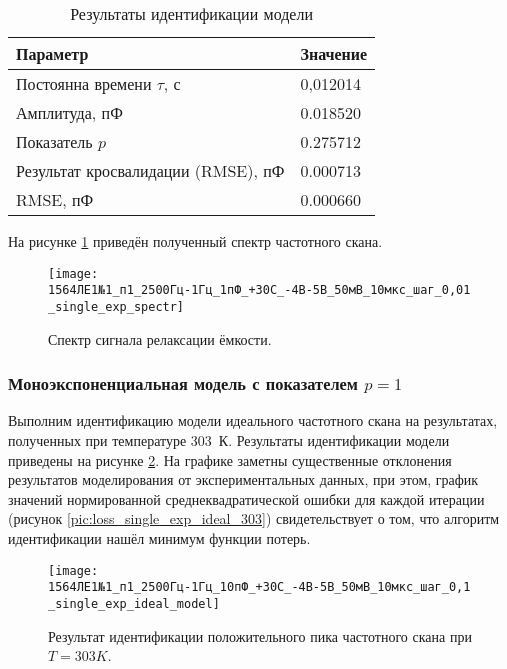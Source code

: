 	\begin{table}[!htp]
		\centering
		\caption{Результаты идентификации модели}
		\begin{tabular}{|l|l|}
			\hline
			Параметр                           & Значение \\ \hline
			Постоянна времени $\tau$, с        & 0,012014 \\ \hline
			Амплитуда, пФ                      & 0.018520 \\ \hline
			Показатель $p$                     & 0.275712 \\ \hline
			Результат кросвалидации (RMSE), пФ & 0.000713 \\ \hline
			RMSE, пФ                           & 0.000660 \\ \hline
		\end{tabular}
		\label{table:results_single_exp_303}
	\end{table}

	На рисунке \ref{pic:spectr_single_exp_303} приведён полученный спектр 
	частотного скана.

	\begin{figure}[!htp]
		\centering
		\texttt{[image: 1564ЛЕ1№1\_п1\_2500Гц-1Гц\_1пФ\_+30С\_-4В-5В\_50мВ\_10мкс\_шаг\_0,01\_single\_exp\_spectr]}
		\caption{Спектр сигнала релаксации ёмкости.}
		\label{pic:spectr_single_exp_303}
	\end{figure}


	\newpage
	\subsubsection{Моноэкспоненциальная модель с показателем $p=1$}
	Выполним идентификацию модели идеального частотного скана на результатах,
	полученных при температуре 303~К. Результаты идентификации модели приведены 
	на рисунке \ref{pic:model_single_exp_ideal_303}. На графике заметны
	существенные отклонения результатов моделирования от экспериментальных 
	данных, при этом, график значений нормированной среднеквадратической ошибки
	для каждой итерации (рисунок \ref{pic:loss_single_exp_ideal_303}) 
	свидетельствует о том, что алгоритм идентификации нашёл минимум функции 
	потерь.

	\begin{figure}[!htp]
		\centering
		\texttt{[image: 1564ЛЕ1№1\_п1\_2500Гц-1Гц\_10пФ\_+30С\_-4В-5В\_50мВ\_10мкс\_шаг\_0,1\_single\_exp\_ideal\_model]}
		\caption{Результат идентификации положительного пика частотного скана
		         при $T=303K$.}
		\label{pic:model_single_exp_ideal_303}
	\end{figure}


